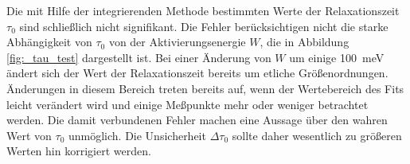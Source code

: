 Die mit Hilfe der integrierenden Methode bestimmten Werte der Relaxationszeit
$\tau_0$ sind schließlich nicht signifikant.
Die Fehler berücksichtigen nicht die starke Abhängigkeit von $\tau_0$ von der
Aktivierungsenergie $W$, die in Abbildung \ref{fig:_tau_test} dargestellt ist.
Bei einer Änderung von $W$ um einige \SI{100}{\milli\electronvolt} ändert
sich der Wert der Relaxationszeit bereits um etliche Größenordnungen.
Änderungen in diesem Bereich treten bereits auf, wenn der Wertebereich des Fits
leicht verändert wird und einige Meßpunkte mehr oder weniger betrachtet werden.
Die damit verbundenen Fehler machen eine Aussage über den wahren Wert von
$\tau_0$ unmöglich.
Die Unsicherheit $\Delta\tau_0$ sollte daher wesentlich zu größeren Werten hin
korrigiert werden.